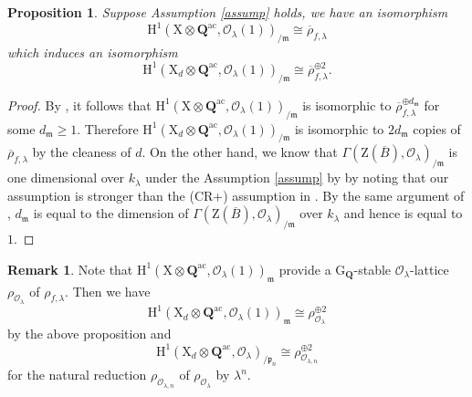 \documentclass[10pt]{amsart}
\numberwithin{equation}{section}
\theoremstyle{plain}
\newtheorem{proposition}[theorem]{Proposition}
\numberwithin{equation}{section}
\theoremstyle{definition}
\newtheorem{remark}[equation]{Remark}
\theoremstyle{remark}
\def\ac{\mathrm{ac}}
\def\frakm{\mathfrak{m}}
\def\ac{\mathrm{ac}}
\def\calO{\mathcal{O}}
\def\frakm{\mathfrak{m}}
\def\frakp{\mathfrak{p}}
\def\QQ{\mathbf{Q}}
\def\rmG{\mathrm{G}}
\def\rmH{\mathrm{H}}
\def\rmX{\mathrm{X}}
\def\rmZ{\mathrm{Z}}
\begin{document}
\begin{proposition}\label{multi-one}
Suppose Assumption \ref{assump} holds,  we have an isomorphism 
\begin{equation*}
\rmH^{1}(\rmX\otimes{\QQ^{\ac}},\calO_{\lambda}(1))_{/\frakm}\cong \overline{\rho}_{f, \lambda} 
\end{equation*}
which induces an isomorphism
\begin{equation*}
\rmH^{1}(\rmX_{d}\otimes\QQ^{\ac}, \calO_{\lambda}(1))_{/\frakm}\cong \overline{\rho}^{\oplus 2}_{f, \lambda}.
\end{equation*}
\end{proposition}
\begin{proof}
By \cite{BLR2}, it follows that $\rmH^{1}(\rmX\otimes{\QQ^{\ac}},\calO_{\lambda}(1))_{/\frakm}$ is isomorphic to $\overline{\rho}^{\oplus d_{\frakm}}_{f,\lambda}$ for some $d_{\frakm}\geq 1$. Therefore $\rmH^{1}(\rmX_{d}\otimes\QQ^{\ac},\calO_{\lambda}(1))_{/\frakm}$ is isomorphic to $2d_{\frakm}$ copies of $\overline{\rho}_{f,\lambda}$ by the cleaness of $d$. On the other hand, we know that $\Gamma(\rmZ(\overline{B}),\calO_{\lambda})_{/\frakm}$ is one dimensional over $k_{\lambda}$ under the Assumption \ref{assump} by \cite[Proposition 6.8]{CH-1} by noting that our assumption is stronger than the (CR+) assumption in \cite[Proposition 6.8]{CH-1}. By the same argument of \cite[Lemma 6.4.2]{LTXZZ}, $d_{\frakm}$ is equal to the dimension of $\Gamma(\rmZ(\overline{B}),\calO_{\lambda})_{/\frakm}$ over $k_{\lambda}$ and hence is equal to $1$.
\end{proof}
\begin{remark}\label{clean-cohomology}
Note that $\rmH^{1}(\rmX\otimes{\QQ^{\ac}},\calO_{\lambda}(1))_{\frakm}$ provide a $\rmG_{\QQ}$-stable $\calO_{\lambda}$-lattice $\rho_{\calO_{\lambda}}$ of $\rho_{f, \lambda}$. Then we have 
\begin{equation*}
\rmH^{1}(\rmX_{d}\otimes\QQ^{\ac},\calO_{\lambda}(1))_{\frakm}\cong \rho^{\oplus 2}_{\calO_{\lambda}}
\end{equation*}
by the above proposition and 
\begin{equation*}
\rmH^{1}(\rmX_{d}\otimes\QQ^{\ac},\calO_{\lambda})_{/\frakp_{n}}\cong \rho^{\oplus 2}_{\calO_{\lambda, n}}
\end{equation*}
for the natural reduction $\rho_{\calO_{\lambda, n}}$ of $\rho_{\calO_{\lambda}}$ by $\lambda^{n}$. 
\end{remark}
\end{document}
